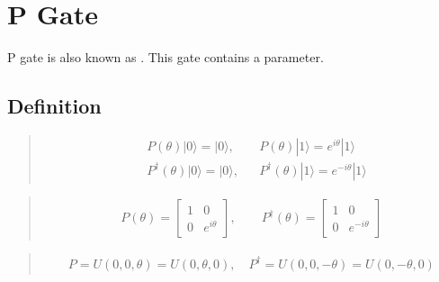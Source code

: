 \documentclass[letterpaper,10pt,english]{jupyterBook}
\begin{document}
\section{P Gate}
\label{\detokenize{q1gates/p:p-gate}}\label{\detokenize{q1gates/p::doc}}
\sphinxAtStartPar
P gate is also known as .  This gate contains a parameter.

\sphinxAtStartPar
{}


\subsection{Definition}
\label{\detokenize{q1gates/p:definition}}
\sphinxAtStartPar
{}
\begin{quote}
\begin{align}
&P(\theta) |0\rangle = |0\rangle, && P(\theta) |1\rangle = e^{i \theta}|1\rangle\\
&P^\dagger(\theta) |0\rangle = |0\rangle, && P^\dagger(\theta) |1\rangle = e^{-i \theta}|1\rangle
\end{align}
\end{quote}

\sphinxAtStartPar
{}
\begin{quote}
\begin{equation*}
\begin{split}
P(\theta) = \begin{bmatrix}1&0\\0&e^{i \theta}\end{bmatrix}, \qquad P^\dagger(\theta) = \begin{bmatrix}1&0\\0&e^{-i \theta}\end{bmatrix}
\end{split}
\end{equation*}\end{quote}

\sphinxAtStartPar
{}
\begin{quote}
\begin{equation*}
\begin{split}
P = U\left(0,0,\theta \right) = U\left(0,\theta,0 \right), \quad P^\dagger = U\left(0,0,-\theta\right)= U\left(0,-\theta,0\right)
\end{split}
\end{equation*}\end{quote}
\end{document}
